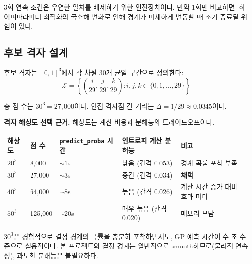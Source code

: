 \documentclass[11pt]{article}
\begin{document}
3회 연속 조건은 우연한 일치를 배제하기 위한 안전장치이다. 만약 1회만 비교하면, 하이퍼파라미터 최적화의 국소해 변화로 인해 경계가 미세하게 변동할 때 조기 종료될 위험이 있다.


\subsection{후보 격자 설계}

후보 격자는 $[0,1]^3$에서 각 차원 30개 균일 구간으로 정의한다:
\begin{equation}\label{eq:candidate-grid}
\mathcal{X} = \left\{ \left(\frac{i}{29}, \frac{j}{29}, \frac{k}{29}\right) : i,j,k \in \{0, 1, \dots, 29\} \right\}
\end{equation}

총 점 수는 $30^3 = 27{,}000$이다. 인접 격자점 간 거리는 $\Delta = 1/29 \approx 0.0345$이다.

\textbf{격자 해상도 선택 근거.} 해상도는 계산 비용과 분해능의 트레이드오프이다.

\begin{table}[htbp]
\centering
\small
\begin{tabular}{@{}lllll@{}}
\toprule
해상도 & 점 수 & \texttt{predict\_proba} 시간 & 엔트로피 계산 분해능 & 비고 \\
\midrule
$20^3$ & 8{,}000 & $\sim 1$s & 낮음 (간격 0.053) & 경계 곡률 포착 부족 \\
$30^3$ & 27{,}000 & $\sim 3$s & 중간 (간격 0.034) & \textbf{채택} \\
$40^3$ & 64{,}000 & $\sim 8$s & 높음 (간격 0.026) & 계산 시간 증가 대비 효과 미미 \\
$50^3$ & 125{,}000 & $\sim 20$s & 매우 높음 (간격 0.020) & 메모리 부담 \\
\bottomrule
\end{tabular}
\end{table}

$30^3$은 경험적으로 결정 경계의 곡률을 충분히 포착하면서도, GP 예측 시간이 수 초 수준으로 실용적이다. 본 프로젝트의 결정 경계는 일반적으로 smooth하므로(물리적 연속성), 과도한 분해능은 불필요하다.
\end{document}
